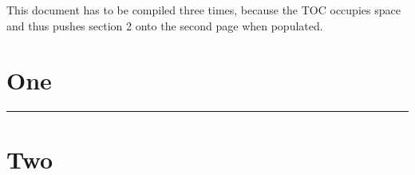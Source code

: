 \documentclass{article}
\begin{document}
This document has to be compiled three times, because the TOC occupies
space and thus pushes section 2 onto the second page when populated.

\tableofcontents

\section{One}
\rule{.2cm}{14cm}
\section{Two}
\end{document}
